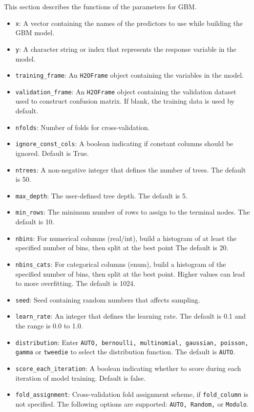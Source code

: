 This section describes the functions of the parameters for GBM. 
\begin{itemize}
\item {\texttt{x}}: A vector containing the names of the predictors to use while building the GBM model. 
\item {\texttt{y}}: A character string or index that represents the response variable in the model.  
\item {\texttt{training\_frame}}: An \texttt{H2OFrame} object containing the variables in the model. 
\item {\texttt{validation\_frame}}: An \texttt{H2OFrame} object containing the validation dataset used to construct confusion matrix. If  blank, the training data is used by default.
\item {\texttt{nfolds}}: Number of folds for cross-validation. 
\item {\texttt{ignore\_const\_cols}}: A boolean indicating if constant columns should be ignored.  Default is True.
\item {\texttt{ntrees}}: A non-negative integer that defines the number of trees. The default is 50.
\item {\texttt{max\_depth}}: The user-defined tree depth. The default is 5.
\item {\texttt{min\_rows}}: The minimum number of rows to assign to the terminal nodes. The default is 10.
\item {\texttt{nbins}}: For numerical columns (real/int), build a histogram of at least the specified number of bins, then split at the best point The default is 20.
\item {\texttt{nbins\_cats}}: For categorical columns (enum), build a histogram of the specified number of bins, then split at the best point. Higher values can lead to more overfitting.  The default is 1024.
\item {\texttt{seed}}: Seed containing random numbers that affects sampling.
\item {\texttt{learn\_rate}}: An integer that defines the learning rate. The default is 0.1 and the range is 0.0 to 1.0.
\item {\texttt{distribution}}: Enter {\texttt{AUTO, bernoulli, multinomial, gaussian, poisson, gamma}} or {\texttt{tweedie}} to select the distribution function. The default is {\texttt{AUTO}}.
\item {\texttt{score\_each\_iteration}}: A boolean indicating whether to score during each iteration of model training.  Default is false.
\item \texttt{fold\_assignment}: Cross-validation fold assignment scheme, if \texttt{fold\_column} is not specified. The following options are supported: \texttt{AUTO, Random,} or \texttt{Modulo}. 

\end{itemize}
